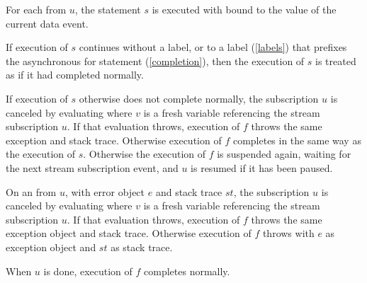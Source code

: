 \documentclass[makeidx]{article}
\begin{document}
{

\LMHash{}%
For each  from $u$,
the statement $s$ is executed with \id{} bound to the value of the current data event.


\LMHash{}%
If execution of $s$ continues without a label, or to a label (\ref{labels}) that prefixes the asynchronous for statement (\ref{completion}), then the execution of $s$ is treated as if it had completed normally.

If execution of $s$ otherwise does not complete normally, the subscription $u$ is canceled by evaluating  where $v$ is a fresh variable referencing the stream subscription $u$.
If that evaluation throws,
execution of $f$ throws the same exception and stack trace.
Otherwise execution of $f$ completes in the same way as the execution of $s$.
Otherwise the execution of $f$ is suspended again, waiting for the next stream subscription event, and $u$ is resumed if it has been paused.

\LMHash{}%
On an  from $u$,
with error object $e$ and stack trace $st$,
the subscription $u$ is canceled by evaluating 
where $v$ is a fresh variable referencing the stream subscription $u$.
If that evaluation throws,
execution of $f$ throws the same exception object and stack trace.
Otherwise execution of $f$ throws with $e$ as exception object and $st$ as stack trace.

\LMHash{}%
When $u$ is done, execution of $f$ completes normally.

}
\end{document}
